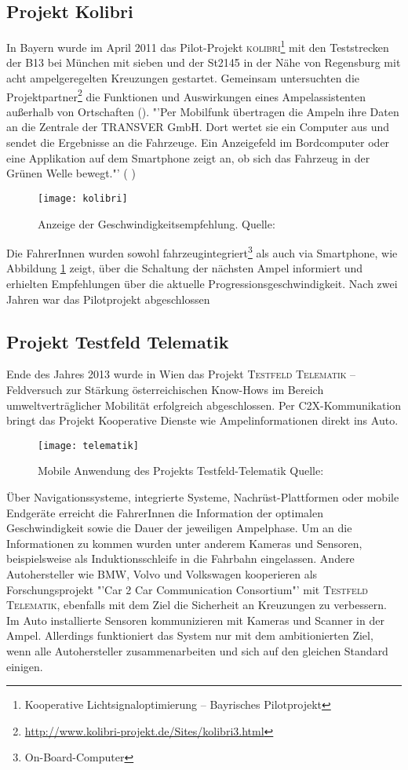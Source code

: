 \subsection*{Projekt Kolibri}
In Bayern wurde im April 2011 das Pilot-Projekt \textsc{kolibri}\footnote{ Kooperative Lichtsignaloptimierung -- Bayrisches Pilotprojekt} mit den Teststrecken der B13 bei München mit sieben und der St2145 in der Nähe von Regensburg mit acht ampelgeregelten Kreuzungen gestartet. Gemeinsam untersuchten die Projektpartner\footnote{ \url{http://www.kolibri-projekt.de/Sites/kolibri3.html}} die Funktionen und Auswirkungen eines Ampelassistenten außerhalb von Ortschaften (\cite{kolibri}). "'Per Mobilfunk übertragen die Ampeln ihre Daten an die Zentrale der TRANSVER GmbH. Dort wertet sie ein Computer aus und sendet die Ergebnisse an die Fahrzeuge. Ein Anzeigefeld im Bordcomputer oder eine Applikation auf dem Smartphone zeigt an, ob sich das Fahrzeug in der Grünen Welle bewegt."' (\cite{kolibriTUM} ) 
\begin{figure}[H]  
    \centering  
    \texttt{[image: kolibri]}      
    \caption[Projekt Kolibri]{Anzeige der Geschwindigkeitsempfehlung. Quelle: \cite{kolibri}}
    \label{fig:kolibri}
\end{figure}
Die FahrerInnen wurden sowohl fahrzeugintegriert\footnote{ On-Board-Computer} als auch via Smartphone, wie Abbildung \ref{fig:kolibri} zeigt, über die Schaltung der nächsten Ampel informiert und erhielten Empfehlungen über die aktuelle Progressionsgeschwindigkeit. Nach zwei Jahren war das Pilotprojekt abgeschlossen 
\subsection*{Projekt Testfeld Telematik}
Ende des Jahres 2013 wurde in Wien das Projekt \textsc{Testfeld Telematik} -- Feldversuch zur Stärkung österreichischen Know-Hows im Bereich umweltverträglicher Mobilität erfolgreich abgeschlossen. Per \gls{C2X}-Kommunikation bringt das Projekt Kooperative Dienste wie Ampelinformationen direkt ins Auto. 
\begin{figure}[H]
    \centering
    \texttt{[image: telematik]} \label{fig:telematik}
    \caption[Projekt Testfeld-Telematik Ampelinformation]{Mobile Anwendung des Projekts Testfeld-Telematik Quelle: \cite{Telematik}}
\end{figure} 
Über Navigationssysteme, integrierte Systeme, Nachrüst-Plattformen oder mobile Endgeräte erreicht die FahrerInnen die Information der optimalen Geschwindigkeit sowie die Dauer der jeweiligen Ampelphase\cite{Telematik}. Um an die Informationen zu kommen wurden unter anderem Kameras und Sensoren, beispielsweise als Induktionsschleife in die Fahrbahn eingelassen. Andere Autohersteller wie \gls{BMW}, Volvo und Volkswagen kooperieren als Forschungsprojekt "'Car 2 Car Communication Consortium"' mit \textsc{Testfeld Telematik}, ebenfalls mit dem Ziel die Sicherheit an Kreuzungen zu verbessern. Im Auto installierte Sensoren kommunizieren mit Kameras und Scanner in der Ampel. Allerdings funktioniert das System nur mit dem ambitionierten Ziel, wenn alle Autohersteller zusammenarbeiten und sich auf den gleichen Standard einigen. \cite{Siemens}
